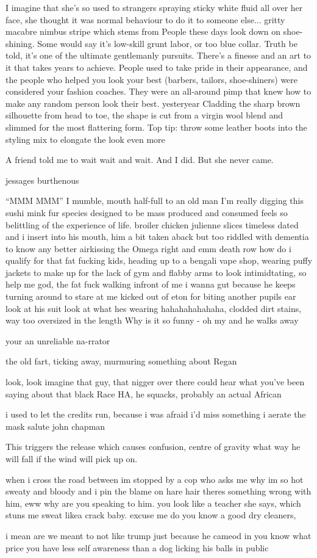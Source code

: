 \documentclass[19pt,openany]{book}
\begin{document}
I imagine that she's so used to strangers spraying sticky white fluid all over her face, she thought it was normal behaviour to do it to someone else...
gritty macabre
nimbus stripe
which stems from
People these days look down on shoe-shining. Some would say it's low-skill grunt labor, or too blue collar. Truth be told, it's one of the ultimate gentlemanly pursuits. There's a finesse and an art to it that takes years to achieve.  People used to take pride in their appearance, and the people who helped you look your best (barbers, tailors, shoe-shiners) were considered your fashion coaches. They were an all-around pimp that knew how to make any random person look their best.
yesteryear
Cladding the sharp brown silhouette from head to toe, the shape is cut from a virgin wool blend and slimmed for the most flattering form. Top tip: throw some leather boots into the styling mix to elongate the look even more

A friend told me to wait wait
and wait. And I did. But she
never came.

jessages
burthenous

``MMM MMM''
I mumble, mouth half-full
to an old man
I'm really digging this
sushi
mink fur
species designed to be mass produced and consumed feels so belittling of the experience of life.
broiler chicken
julienne slices
timeless dated
and i insert into his
mouth, him a bit taken
aback but too riddled
with dementia to know
any better
airkissing the Omega
right and emm
death row how do i qualify for that
fat fucking kids, heading up to a bengali vape shop,
wearing puffy jackets to make up for the lack of gym and flabby arms
to look intimidtating,
so help me god, the fat fuck walking infront of me i wanna gut because he keeps
turning around to stare at me
kicked out of eton for biting
another pupils ear
look at his suit
look at what hes wearing
hahahahahahaha, clodded dirt
stains, way too oversized in the length
Why is it so funny - oh my and
he walks away

your an unreliable na-rrator

the old fart, ticking away, murmuring
something about Regan

look, look imagine that
guy, that nigger over there
could hear what you've been
saying about that black Race
HA, he squacks, probably
an actual African

i used to let the credits
run, because i was afraid i'd miss something
i aerate the mask
salute john chapman


This triggers the
release which
causes confusion,
centre of gravity
what way he will fall
if the wind
will pick up on.

when i cross the road
between im stopped by
a cop who asks me why
im so hot sweaty
and bloody and i pin the
blame on
hare hair
theres something
wrong with him,
eww why are you speaking
to him. you look like a teacher
she says, which stuns
me
sweat likea  crack baby.
excuse me do you know
a good dry cleaners,

i mean are we meant to not like trump just because he cameod in
you know what price you have less self awareness than a dog licking his
balls in public
\end{document}
